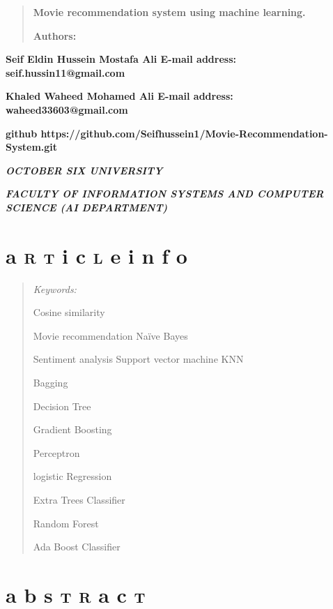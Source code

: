 \documentclass[
]{article}
\author{}
\date{}
\begin{document}
\begin{quote}
\textbf{Movie recommendation system using machine learning.}

\textbf{Authors:}
\end{quote}

\textbf{Seif Eldin Hussein Mostafa Ali E-mail address:
seif.hussin11@gmail.com}

\textbf{Khaled Waheed Mohamed Ali E-mail address: waheed33603@gmail.com}

\textbf{github
https://github.com/Seifhussein1/Movie-Recommendation-System.git}

\emph{\textbf{OCTOBER SIX UNIVERSITY}}

\emph{\textbf{FACULTY OF INFORMATION SYSTEMS AND COMPUTER SCIENCE (AI
DEPARTMENT)}}

\hypertarget{a-r-t-i-c-l-e-i-n-f-o}{%
\section{\texorpdfstring{a \textsc{r} \textsc{t} i c \textsc{l} e i n f
o}{a r t i c l e i n f o}}\label{a-r-t-i-c-l-e-i-n-f-o}}

\begin{quote}
\emph{Keywords:}

Cosine similarity

Movie recommendation Naïve Bayes

Sentiment analysis Support vector machine KNN

Bagging

Decision Tree

Gradient Boosting

Perceptron

logistic Regression

Extra Trees Classifier

Random Forest

Ada Boost Classifier
\end{quote}

\hypertarget{a-b-s-t-r-a-c-t}{%
\section{\texorpdfstring{\hfill\break
a b s \textsc{t} \textsc{r} a c
\textsc{t}}{ a b s t r a c t}}\label{a-b-s-t-r-a-c-t}}
\end{document}
